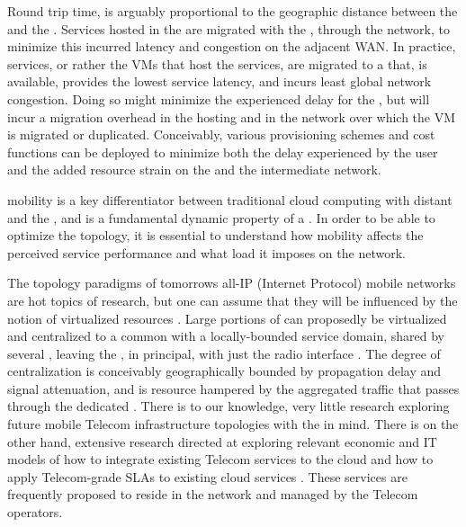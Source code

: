 Round trip time, is arguably proportional to the geographic distance between the \ue{} and the \dc{}. Services hosted in the \xcloud{} are migrated with the \ue{}, through the network, to minimize this incurred latency and congestion on the adjacent WAN. In practice, services, or rather the VMs that host the services, are migrated to a \dc{} that, is available, provides the lowest service latency, and incurs least global network congestion. Doing so might minimize the experienced delay for the \ue{}, but will incur a migration overhead in the hosting \dc{} and in the network over which the VM is migrated or duplicated. Conceivably, various provisioning schemes and cost functions can be deployed to minimize both the delay experienced by the user and the added resource strain on the \dc{} and the intermediate network.

\Ue{} mobility is a key differentiator between traditional cloud computing with distant \dcs{} and the \xcloud{}, and is a fundamental dynamic property of a \xcloud{}. In order to be able to optimize the \xcloud{} topology, it is essential to understand how \ue{} mobility affects the perceived service performance and what load it imposes on the network.

The topology paradigms of tomorrows all-IP (Internet Protocol) mobile networks \cite{6144211,5357099} are hot topics of research, but one can assume that they will be influenced by the notion of virtualized resources \cite{baroncelli2010network, chowdhury2009network}. Large portions of \rbss{} can proposedly be virtualized and centralized to a common \dc{} with a locally-bounded service domain, shared by several \rbss{}, leaving the \rbss{}, in principal, with just the radio interface \cite{melzercloud}. The degree of centralization is conceivably geographically bounded by propagation delay and signal attenuation, and is resource hampered by the aggregated traffic that passes through the dedicated \dc{}. There is to our knowledge, very little research exploring future mobile Telecom infrastructure topologies with the \xcloud{} in mind. There is on the other hand, extensive research directed at exploring relevant economic and IT models of how to integrate existing Telecom services to the cloud and how to apply Telecom-grade SLAs to existing cloud services \cite{EricssonWhitePaper,6156350, 5357099}. These services are frequently proposed to reside in the network and managed by the Telecom operators.

